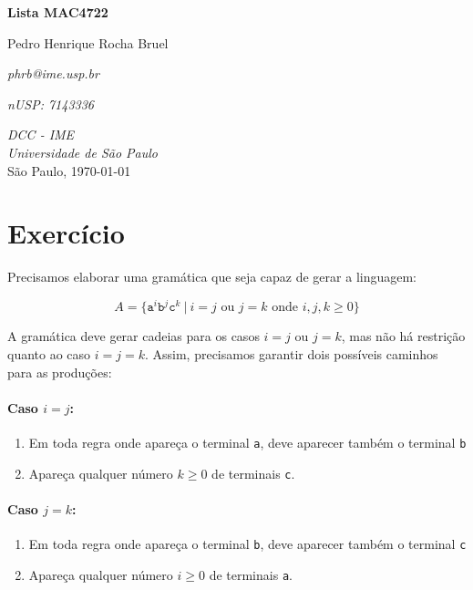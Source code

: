 \documentclass[a4paper, 12pt]{article}
\newcommand{\rom}[1]{\uppercase\expandafter{\romannumeral #1\relax}}
\begin{document}
\begin{titlepage}
    \centering
    \vspace*{4cm}
    \textbf{\huge{Lista \rom{4} MAC4722}}\\

    \vskip 1cm

    Pedro Henrique Rocha Bruel

    \emph{phrb@ime.usp.br}

    \emph{nUSP: 7143336}

    \vfill
    \normalsize{\emph{DCC - IME\\
    Universidade de São Paulo}\\}
    \normalsize{São Paulo, \today}
\end{titlepage}

\section*{Exercício \rom{2}} \label{sec:ex2}

Precisamos elaborar uma gramática que seja capaz
de gerar a linguagem:

\[
    A = \{\texttt{a}^{i}\texttt{b}^{j}\texttt{c}^{k} \: | \: i=j \text{ ou } j=k \text{ onde } i,j,k \geq 0\}
\]

A gramática deve gerar cadeias para os casos $i=j$ ou $j=k$, mas não há
restrição quanto ao caso $i=j=k$. Assim, precisamos garantir
dois possíveis caminhos para as produções:

\paragraph{Caso $i=j$:}
\begin{enumerate}
    \item Em toda regra onde apareça o terminal \texttt{a}, deve aparecer
        também o terminal \texttt{b}
    \item Apareça qualquer número $k\geq0$ de terminais \texttt{c}.
\end{enumerate}

\paragraph{Caso $j=k$:}
\begin{enumerate}
    \item Em toda regra onde apareça o terminal \texttt{b}, deve aparecer
        também o terminal \texttt{c}
    \item Apareça qualquer número $i\geq0$ de terminais \texttt{a}.
\end{enumerate}
\end{document}

